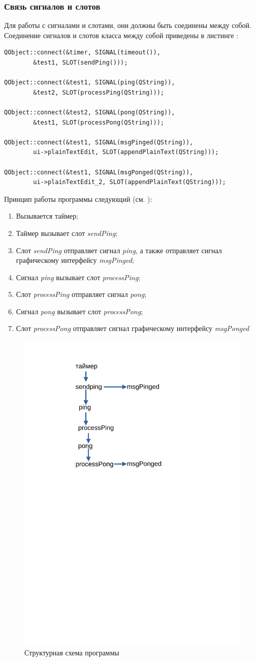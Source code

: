 \documentclass[../AISTR.tex]{subfiles}
\begin{document}
\subsubsection{Связь сигналов и слотов}
Для работы с сигналами и слотами, они должны быть соединены между собой. Соединение сигналов и слотов класса между собой приведены в листинге :


\begin{lstlisting}[caption=Соединение сигналов и слотов,captionpos=b, label={list:connect}]
QObject::connect(&timer, SIGNAL(timeout()),
		&test1, SLOT(sendPing()));

QObject::connect(&test1, SIGNAL(ping(QString)),
		&test2, SLOT(processPing(QString)));

QObject::connect(&test2, SIGNAL(pong(QString)),
		&test1, SLOT(processPong(QString)));

QObject::connect(&test1, SIGNAL(msgPinged(QString)),
		ui->plainTextEdit, SLOT(appendPlainText(QString)));

QObject::connect(&test1, SIGNAL(msgPonged(QString)),
		ui->plainTextEdit_2, SLOT(appendPlainText(QString)));		
\end{lstlisting}
Принцип работы программы следующий (см. ):
\begin{enumerate}
	\item Вызывается таймер;
	\item Таймер вызывает слот \textit{sendPing};
	\item Слот \textit{sendPing} отправляет сигнал \textit{ping}, а также отправляет сигнал графическому интерфейсу \textit{msgPinged};
	\item Сигнал \textit{ping} вызывает слот \textit{processPing};
	\item Слот \textit{processPing} отправляет сигнал \textit{pong};
	\item Сигнал \textit{pong} вызывает слот \textit{processPong};
	\item Слот \textit{processPong} отправляет сигнал графическому интерфейсу \textit{msgPonged}
\end{enumerate}


\begin{figure}[p]
	\centering
	\includegraphics[trim=80 480 200 60,clip,width=0.5\linewidth]{"../images/схема пингпонг"}
	\caption{Структурная схема программы}
	\label{fig:pp-scheme}
\end{figure}
\end{document}

